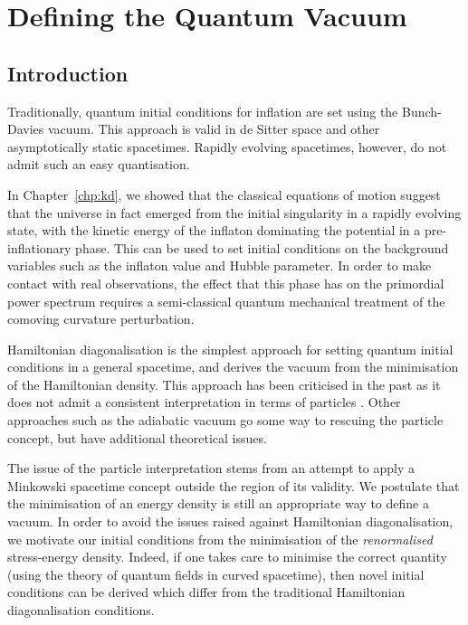 \chapter{Defining the Quantum Vacuum}
\label{chp:qv}


\section{Introduction}
\label{sec:qv:introduction}
Traditionally, quantum initial conditions for inflation are set using the Bunch-Davies vacuum. This approach is valid in de Sitter space and other asymptotically static spacetimes. Rapidly evolving spacetimes, however, do not admit such an easy quantisation. 

In Chapter~\ref{chp:kd}, we showed that the classical equations of motion suggest that the universe in fact emerged from the initial singularity in a rapidly evolving state, with the kinetic energy of the inflaton dominating the potential in a pre-inflationary phase. 
This can be used to set initial conditions on the background variables such as the inflaton value and Hubble parameter. 
In order to make contact with real observations, the effect that this phase has on the primordial power spectrum requires a semi-classical quantum mechanical treatment of the comoving curvature perturbation.

Hamiltonian diagonalisation is the simplest approach for setting quantum initial conditions in a general spacetime, and derives the vacuum from the minimisation of the Hamiltonian density. This approach has been criticised in the past as it does not admit a consistent interpretation in terms of particles \citep{Fulling+1989,Fulling_HD}. Other approaches such as the adiabatic vacuum go some way to rescuing the particle concept, but have additional theoretical issues. 

The issue of the particle interpretation stems from an attempt to apply a Minkowski spacetime concept outside the region of its validity.  
We postulate that the minimisation of an energy density is still an appropriate way to define a vacuum. In order to avoid the issues raised against Hamiltonian diagonalisation, we motivate our initial conditions from the minimisation of the {\em renormalised\/} stress-energy density. 
Indeed, if one takes care to minimise the correct quantity (using the theory of quantum fields in curved spacetime), then novel initial conditions can be derived which differ from the traditional Hamiltonian diagonalisation conditions.

